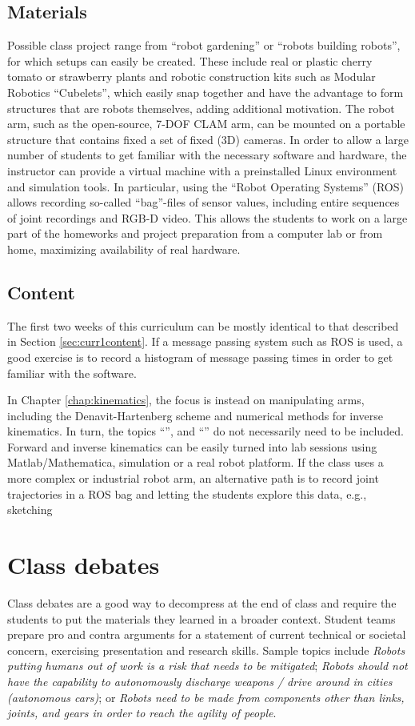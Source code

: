 \documentclass[paper=6.14in:9.21in,pagesize=pdftex,11pt,twoside,openright]{scrbook}
\begin{document}
\subsection{Materials} 
Possible class project range from ``robot gardening'' or ``robots building robots'', for which setups can easily be created. These include real or plastic cherry tomato or strawberry plants and robotic construction kits such as Modular Robotics ``Cubelets'', which easily snap together and have the advantage to form structures that are robots themselves, adding additional motivation. The robot arm, such as the open-source, 7-DOF CLAM arm, can be mounted on a portable structure that contains fixed a set of fixed (3D) cameras. In order to allow a large number of students to get familiar with the necessary software and hardware, the instructor can provide a virtual machine with a preinstalled Linux environment and simulation tools. In particular, using the ``Robot Operating Systems'' (ROS) allows recording so-called ``bag''-files of sensor values, including entire sequences of joint recordings and RGB-D video. This allows the students to work on a large part of the homeworks and project preparation from a computer lab or from home, maximizing availability of real hardware.

\subsection{Content}
The first two weeks of this curriculum can be mostly identical to that described in Section \ref{sec:curr1content}. If a message passing system such as ROS is used, a good exercise is to record a histogram of message passing times in order to get familiar with the software.

In Chapter \ref{chap:kinematics}, the focus is instead on manipulating arms, including the Denavit-Hartenberg scheme and numerical methods for inverse kinematics. In turn, the topics ``'', and ``'' do not necessarily need to be included. Forward and inverse kinematics can be easily turned into lab sessions using Matlab/Mathematica, simulation or a real robot platform. If the class uses a more complex or industrial robot arm, an alternative path is to record joint trajectories in a ROS bag and letting the students explore this data, e.g., sketching 


\section{Class debates}\label{sec:debates}
Class debates are a good way to decompress at the end of class and require the students to put the materials they learned in a broader context. Student teams prepare pro and contra arguments for a statement of current technical or societal concern, exercising presentation and research skills. Sample topics include \emph{Robots putting humans out of work is a risk that needs to be mitigated}; \emph{Robots should not have the capability to autonomously discharge weapons / drive around in cities (autonomous cars)}; or \emph{Robots need to be made from components other than links, joints, and gears in order to reach the agility of people}.
\end{document}
